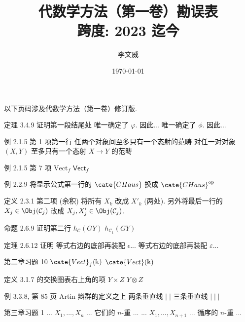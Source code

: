 \documentclass{AJerrata}
\title{\bfseries 代数学方法（第一卷）勘误表 \\ 跨度: 2023 迄今 }
\author{李文威}
\date{\today}
\begin{document}
	\maketitle
	以下页码涉及代数学方法（第一卷）修订版.

	\begin{Errata}
		\item[定理 3.4.9 证明第一段结尾处]
		\Orig 唯一确定了 $\varphi$. 因此...
		\Corr 唯一确定了 $\phi$. 因此...
		
		\item[例 2.1.5 第 1 项第一行]
		\Orig 任两个对象间至多只有一个态射的范畴
		\Corr 对任一对对象 $(X, Y)$ 至多只有一个态射 $X \to Y$ 的范畴
		
		\item[例 2.1.5 第 7 项]
		\Orig $\mathrm{Vect}_f$
		\Corr $\mathsf{Vect}_f$
		
		\item[例 2.2.9]
		将显示公式第一行的 $\cate{CHaus}$ 换成 $\cate{CHaus}^{\text{op}}$
		
		\item[定义 2.3.1 第二项 (余积)]
		将所有 $X_k$ 改成 $X'_k$ (两处). 另外将最后一行的 $X_j \in \Obj(\mathcal{C}_j)$ 改成 $X_j, X'_j \in \Obj(\mathcal{C}_j)$.
		
		\item[命题 2.6.9 证明第二行]
		\Orig $h_{\mathcal{C}}(GY)$
		\Corr $h_{\mathcal{C}_1}(GY)$
		
		\item[定理 2.6.12 证明]
		\Orig 等式右边的底部再装配 $\epsilon$...
		\Corr 等式右边的底部再装配 $\varepsilon$...
		
		\item[第二章习题 10]
		\Orig $\cate{Vect}_f(\Bbbk)$
		\Corr $\cate{Vect}(\Bbbk)$
		
		\item[定义 3.1.7 的交换图表右上角的项]
		\Orig $Y \times Z$
		\Corr $Y \otimes Z$
		
		\item[例 3.3.8, 第 85 页 Artin 辫群的定义之上]
		\Orig 两条垂直线 $\vert\;\vert$
		\Corr 三条垂直线 $\vert\;\vert\;\vert$
		
		\item[第三章习题 1]
		\Orig ... $X_1, \ldots, X_n$ ... 它们的 $n$-重 ...
		\Corr ... $X_1, \ldots, X_{n+1}$ ... 循序的 $n$-重 ...
		

\end{Errata}
\end{document}
